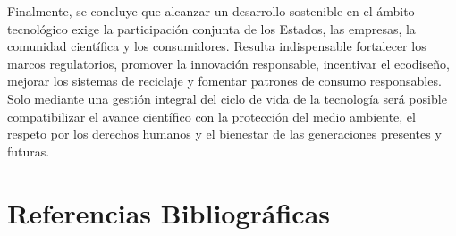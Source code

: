 \documentclass[stu,12pt,a4paper]{apa7}
\begin{document}
Finalmente, se concluye que alcanzar un desarrollo sostenible en el ámbito tecnológico exige la participación conjunta de los Estados, las empresas, la comunidad científica y los consumidores. Resulta indispensable fortalecer los marcos regulatorios, promover la innovación responsable, incentivar el ecodiseño, mejorar los sistemas de reciclaje y fomentar patrones de consumo responsables. Solo mediante una gestión integral del ciclo de vida de la tecnología será posible compatibilizar el avance científico con la protección del medio ambiente, el respeto por los derechos humanos y el bienestar de las generaciones presentes y futuras. 

\newpage
    \section{Referencias Bibliográficas}
\end{document}
